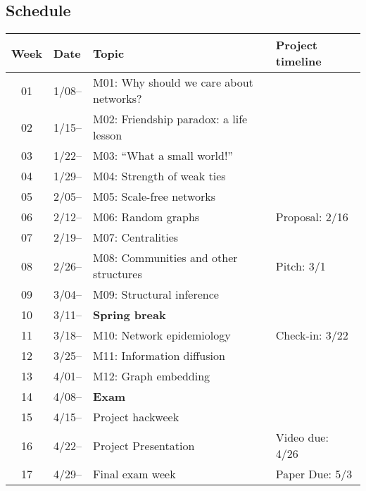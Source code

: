 \subsection{Schedule}\label{sub:schedule}%

\begin{tabular}{@{}clll@{}} \toprule
  Week & Date & Topic & Project timeline\\\midrule
  01 & 1/08-- & M01: Why should we care about networks? & \\
  02 & 1/15-- & M02: Friendship paradox: a life lesson & \\
  03 & 1/22-- & M03: ``What a small world!'' \\
  04 & 1/29-- & M04: Strength of weak ties \\
  05 & 2/05-- & M05: Scale-free networks \\
  06 & 2/12-- & M06: Random graphs & Proposal: 2/16 \\
  07 & 2/19-- & M07: Centralities \\
  08 & 2/26-- & M08: Communities and other structures & Pitch: 3/1 \\
  09 & 3/04-- & M09: Structural inference \\
  10 & 3/11-- & \textbf{Spring break} \\
  11 & 3/18-- & M10: Network epidemiology & Check-in: 3/22\\
  12 & 3/25-- & M11: Information diffusion \\
  13 & 4/01-- & M12: Graph embedding\\
  14 & 4/08-- & \textbf{Exam} \\
  15 & 4/15-- & Project hackweek \\
  16 & 4/22-- & Project Presentation & Video due: 4/26 \\
  17 & 4/29-- & Final exam week & Paper Due: 5/3 \\ 
  \bottomrule
\end{tabular}


